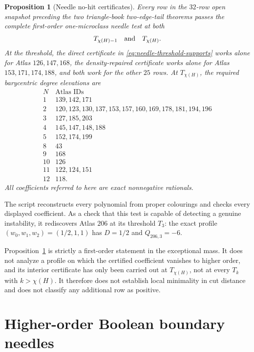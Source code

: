 \documentclass[11pt]{article}
\newtheorem{proposition}[theorem]{Proposition}
\begin{document}
\begin{proposition}[Needle no-hit certificates]\label{prop:needle-no-hit}
Every row in the $32$-row open snapshot preceding the two triangle-book
two-edge-tail theorems passes the complete first-order
one-microclass needle test at both
\[
 T_{\chi(H)-1}\quad\hbox{and}\quad T_{\chi(H)}.
\]
At the threshold, the direct certificate in
\eqref{eq:needle-threshold-supports} works alone for Atlas
$126,147,168$, the density-repaired certificate works alone for Atlas
$153,171,174,188$, and both work for the other $25$ rows.
At $T_{\chi(H)}$, the required barycentric degree elevations are
\[
\begin{array}{c|l}
N&\text{Atlas IDs}\\ \hline
1&139,142,171\\
2&120,123,130,137,153,157,160,169,178,181,194,196\\
3&127,185,203\\
4&145,147,148,188\\
5&152,174,199\\
8&43\\
9&168\\
10&126\\
11&122,124,151\\
12&118.
\end{array}
\]
All coefficients referred to here are exact nonnegative rationals.
\end{proposition}

The script reconstructs every polynomial from proper colourings and checks
every displayed coefficient.  As a check that this test is capable of
detecting a genuine instability, it rediscovers Atlas $206$ at its threshold
$T_3$: the exact profile
$(w_0,w_1,w_2)=(1/2,1,1)$ has $D=1/2$ and
$Q_{206,3}=-6$.

Proposition~\ref{prop:needle-no-hit} is strictly a first-order statement in
the exceptional mass.  It does not analyze a profile on which the certified
coefficient vanishes to higher order, and its interior certificate has only
been carried out at $T_{\chi(H)}$, not at every $T_k$ with
$k>\chi(H)$.  It therefore does not establish local minimality in cut
distance and does not classify any additional row as positive.


\section{Higher-order Boolean boundary needles}
\end{document}
